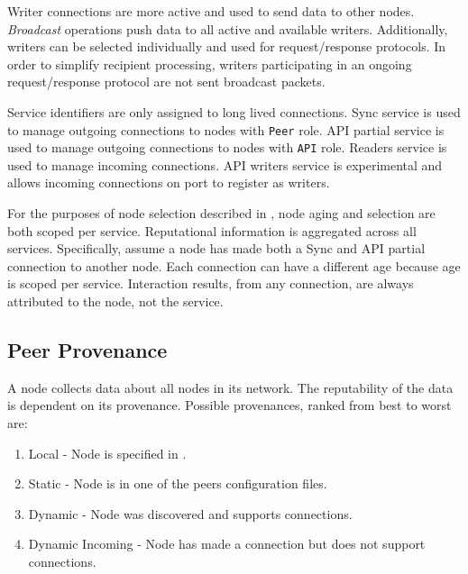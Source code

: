 Writer connections are more active and used to send data to other nodes.
\emph{Broadcast} operations push data to all active and available writers.
Additionally, writers can be selected individually and used for request/response protocols.
In order to simplify recipient processing, writers participating in an ongoing request/response protocol are not sent broadcast packets.

Service identifiers are only assigned to long lived connections.
Sync service is used to manage outgoing connections to nodes with \texttt{Peer} role.
API partial service is used to manage outgoing connections to nodes with \texttt{API} role.
Readers service is used to manage incoming connections.
API writers service is experimental and allows incoming connections on port  to register as writers.

\begin{figure}[H]
	\label{tbl:network:serviceIdentifiers}
\end{figure}

For the purposes of node selection described in , node aging and selection are both scoped per service.
Reputational information is aggregated across all services.
Specifically, assume a node has made both a Sync and API partial connection to another node.
Each connection can have a different age because age is scoped per service.
Interaction results, from any connection, are always attributed to the node, not the service.

\subsection{Peer Provenance}

A node collects data about all nodes in its network.
The reputability of the data is dependent on its provenance.
Possible provenances, ranked from best to worst are:
\begin{enumerate}
	\item{Local - Node is specified in .}
	\item{Static - Node is in one of the peers configuration files.}
	\item{Dynamic - Node was discovered and supports connections.}
	\item{Dynamic Incoming - Node has made a connection but does not support connections.}
\end{enumerate}

